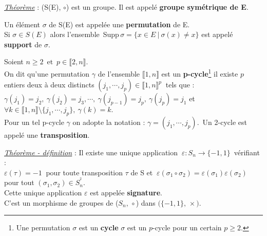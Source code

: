 \vspace{1cm}

\underline{\emph{Théorème}} : (S(E), \(\circ\)) est un groupe. Il est appelé \textbf{groupe symétrique de E}.

\vspace{1cm}

Un élément \(\sigma\) de S(E) est appelée une \textbf{permutation} de E.\\
Si \(\sigma\in S(E)\) alors l'ensemble\, Supp\(\, \sigma =\{x\in E \ \rvert \ \sigma(x)\neq x\}\) est appelé \textbf{support} de \(\sigma\).

\vspace{1cm}

Soient \(n\geq 2\, \text{ et }\, p\in\llbracket 2,n\rrbracket.\)\\
On dit qu'une permutation $\gamma$ de l'ensemble \(\llbracket 1,n\rrbracket\) est un \textbf{p-cycle}\footnote{Une permutation $\sigma$ est un \textbf{cycle} \ssi $\sigma$ est un $p$-cycle pour un certain $p\geq 2$.} \ssi il existe $p$ entiers deux à deux distincts \(\displaystyle(j_1,\cdots,j_p)\in\llbracket 1,n\rrbracket^p\ \) tels que :\vspace{0.1cm}\\
\(\gamma(j_1)=j_2,\ \gamma(j_2)=j_3,\cdots ,\ \gamma(j_{p-1})=j_p,\ \gamma(j_p)=j_1\) et \(\forall k\in \llbracket 1,n\rrbracket\setminus\{j_1,\cdots,j_p\},\ \gamma(k)=k. \)\vspace{0.3cm}\\
Pour un tel p-cycle $\gamma$ on adopte la notation : \(\gamma = (j_1,\cdots,j_p).\,\) Un 2-cycle est appelé une \textbf{transposition}.

\vspace{1.2cm}

\underline{\emph{Théorème - définition}} : Il existe une unique application \(\ \varepsilon : S_n\to \{-1,1\}\,\) vérifiant :\vspace{0.1cm}\\
\(\varepsilon(\tau)=-1\ \) pour toute transposition $\tau$ de S et \(\ \varepsilon(\sigma_1\circ \sigma_2)=\varepsilon(\sigma_1)\varepsilon(\sigma_2)\ \) pour tout \((\sigma_1, \sigma_2)\in S_n^{^2}.\)\vspace{0.1cm}\\
Cette unique application $\varepsilon$ est appelée \textbf{signature}.\vspace{0.1cm}\\
C'est un morphisme de groupes de (\(S_n,\,\circ\)) dans \(\bigl(\{-1,1\},\, \times\bigr)\).\vspace{0.6cm}

